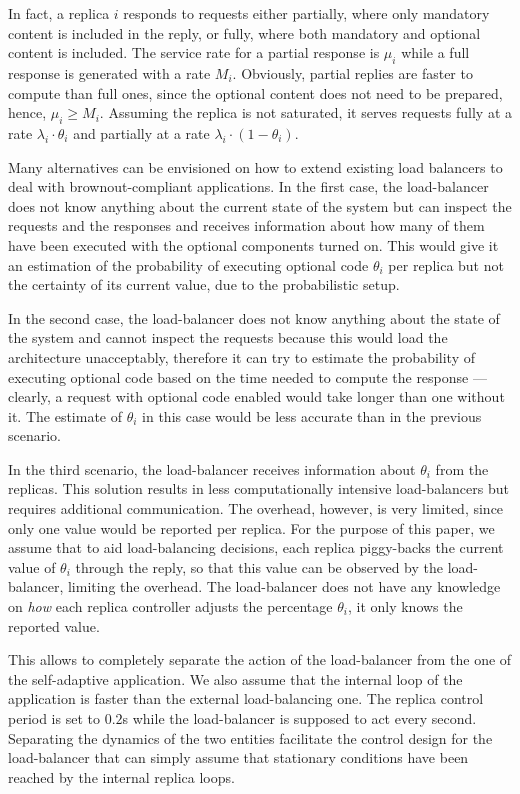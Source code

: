 In fact, a replica $i$ responds to requests either partially, where
only mandatory content is included in the reply, or fully, where both
mandatory and optional content is included. The service rate for a
partial response is $\mu_i$ while a full response is generated with a
rate $M_i$. Obviously, partial replies are faster to compute than full
ones, since the optional content does not need to be prepared, hence,
$\mu_i \geq M_i$. Assuming the replica is not saturated, it serves
requests fully at a rate $\lambda_i \cdot \theta_i$ and partially at a
rate $\lambda_i \cdot (1-\theta_i)$.

Many alternatives can be envisioned on how to extend existing load
balancers to deal with brownout-compliant applications.  In the first
case, the load-balancer does not know anything about the current state
of the system but can inspect the requests and the responses and
receives information about how many of them have been executed with
the optional components turned on. This would give it an estimation of
the probability of executing optional code $\theta_i$ per replica but
not the certainty of its current value, due to the probabilistic
setup.

In the second case, the load-balancer does not know anything about the
state of the system and cannot inspect the requests because this would
load the architecture unacceptably, therefore it can try to estimate
the probability of executing optional code based on the time needed to
compute the response --- clearly, a request with optional code enabled
would take longer than one without it. The estimate of $\theta_i$ in
this case would be less accurate than in the previous scenario.

In the third scenario, the load-balancer receives information about
$\theta_i$ from the replicas. This solution results in less
computationally intensive load-balancers but requires additional
communication. The overhead, however, is very limited, since only one
value would be reported per replica. For the purpose of this paper, we
assume that to aid load-balancing decisions, each replica piggy-backs
the current value of $\theta_i$ through the reply, so that this value
can be observed by the load-balancer, limiting the overhead. The
load-balancer does not have any knowledge on \emph{how} each replica
controller adjusts the percentage $\theta_i$, it only knows the
reported value.

This allows to completely separate the action of the load-balancer
from the one of the self-adaptive application. We also assume that the
internal loop of the application is faster than the external
load-balancing one. The replica control period is set to $0.2$s while
the load-balancer is supposed to act every second. Separating the
dynamics of the two entities facilitate the control design for the
load-balancer that can simply assume that stationary conditions have
been reached by the internal replica loops.

